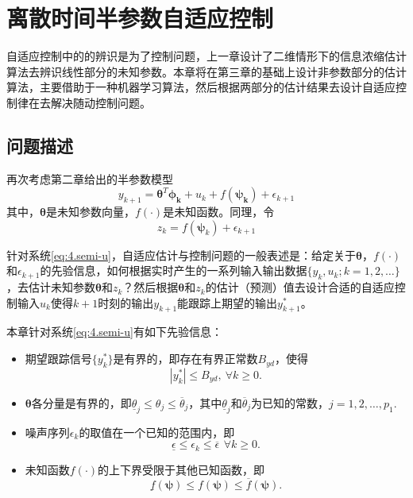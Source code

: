 \chapter{离散时间半参数自适应控制}\label{chap:4}
自适应控制中的的辨识是为了控制问题，上一章设计了二维情形下的信息浓缩估计算法去辨识线性部分的未知参数。本章将在第三章的基础上设计非参数部分的估计算法，主要借助于一种机器学习算法，然后根据两部分的估计结果去设计自适应控制律在去解决随动控制问题。

\section{问题描述}\label{sect:4.1}
再次考虑第二章给出的半参数模型
\begin{equation}%
\label{eq:4.semi-u}
y_{k+1} = \bm{\theta}^{T}\bm{\phi_{k}}+u_{k}+f(\bm{\bm{\psi}_{k}})+\epsilon_{k+1}
\end{equation}
其中，$\bm{\theta}$是未知参数向量，$f(\cdot)$是未知函数。同理，令
\begin{equation}
z_{k} = f(\bm{\psi}_{k}) + \epsilon_{k+1}
\end{equation}

针对系统\eqref{eq:4.semi-u}，自适应估计与控制问题的一般表述是：给定关于$\bm{\theta}$，$f(\cdot)$和$\epsilon_{k+1}$的先验信息，如何根据实时产生的一系列输入输出数据$\{y_{k},u_{k};k=1,2,\ldots\}$，去估计未知参数$\bm{\theta}$和$z_{k}$？然后根据$\bm{\theta}$和$z_{k}$的估计（预测）值去设计合适的自适应控制输入$u_{k}$使得$k+1$时刻的输出$y_{k+1}$能跟踪上期望的输出$y_{k+1}^{*}$。

本章针对系统\eqref{eq:4.semi-u}有如下先验信息：
\begin{itemize}
\item 期望跟踪信号$\{y_{k}^{*}\}$是有界的，即存在有界正常数$B_{yd}$，使得
\begin{equation}\label{eq:4.ydB}
|y_{k}^{*}|\leq B_{yd},\ \forall k\geq0.
\end{equation}
\item $\bm{\theta}$各分量是有界的，即$\underline{\theta}_{j}\leq\theta_{j}\leq\overline{\theta}_{j}$，其中$\underline{\theta}_{j}$和$\overline{\theta}_{j}$为已知的常数，$j=1,2,\ldots,p_{1}$.
\item 噪声序列$\epsilon_{k}$的取值在一个已知的范围内，即
\begin{equation}\label{eq:4.wB}
\underline{\epsilon}\leq\epsilon_{k}\leq\overline{\epsilon}\,\ \forall k\geq0.
\end{equation}
\item 未知函数$f(\cdot)$的上下界受限于其他已知函数，即
\begin{equation}\label{eq:4.fB}
\underline{f}(\bm{\psi})\leq f(\bm{\psi})\leq \overline{f}(\bm{\psi}).
\end{equation}
\end{itemize}

